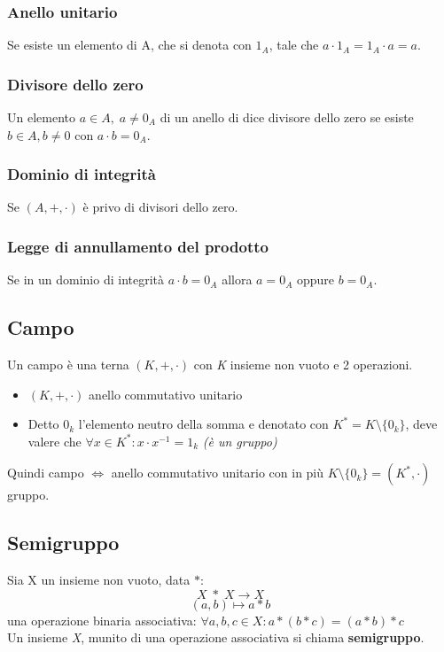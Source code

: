 \subsubsection{Anello unitario} 
Se esiste un elemento di A, che si denota con \(1_A\), tale che \(a\cdot 1_A=1_A\cdot a=a\).

\subsubsection{Divisore dello zero} 
Un elemento \(a\in A,\; a\neq0_A\) di un anello di dice divisore dello zero se esiste \(b\in A,b\neq 0\) con \(a\cdot b=0_A\).

\subsubsection{Dominio di integrità} 
Se \((A,+,\cdot)\) è privo di divisori dello zero.

\subsubsection{Legge di annullamento del prodotto} 
Se in un dominio di integrità \(a\cdot b=0_A\) allora \(a=0_A\) oppure \(b=0_A\).

\subsection{Campo}
Un campo è una terna \((K,+,\cdot)\) con \textit{K} insieme non vuoto e 2 operazioni.
\begin{itemize}
    \item \((K,+,\cdot)\) anello commutativo unitario
    \item Detto \(0_k\) l'elemento neutro della somma e denotato con \(K^*=K\setminus\{0_k\}\), deve valere che \(\forall x\in K^*:x\cdot x^{-1}=1_k\) \textit{(è un gruppo)}
\end{itemize}
Quindi campo \(\Leftrightarrow\) anello commutativo unitario con in più \(K\setminus\{0_k\}=(K^*,\cdot)\) gruppo.

\subsection{Semigruppo}
Sia X un insieme non vuoto, data $*$: 
\[X\;*\;X\rightarrow X\]
\[(a,b)\mapsto a * b\]
una operazione binaria associativa: \(\forall a,b,c\in X: a*(b*c)=(a*b)*c\)
\\
Un insieme \textit{X}, munito di una operazione associativa si chiama \textbf{semigruppo}.


